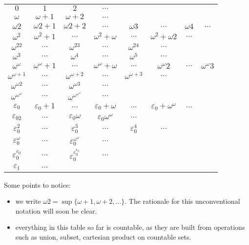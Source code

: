 \documentclass[a4paper]{article}
\begin{document}
{%
  \renewcommand{\arraystretch}{2.5}
\begin{table}[h!]
  \centering
  \begin{tabular}{cccccccc}
    \(0\) & \(1\) & \(2\) & \(\dots\) \\
    \(\omega\) & \(\omega + 1\) & \(\omega + 2\) & \(\dots\) \\
    \(\omega 2\) & \(\omega2 + 1\) & \(\omega2 + 2\) & \(\dots\) & \(\omega3\) & \(\dots\) & \(\omega4\) & \(\dots\) \\
    \(\omega^2\) & \(\omega^2 + 1\) & \(\dots\) & \(\omega^2 + \omega\) & \(\dots\) & \(\omega^2 + \omega2\) & \(\dots\) \\
    \(\omega^22\) & \(\dots\) & \(\omega^23\) & \(\dots\) & \(\omega^24\) & \(\dots\) \\
    \(\omega^3\) & \(\dots\) & \(\omega^4\) & \(\dots\) & \(\omega^5\) & \(\dots\) \\
    \(\omega^\omega\) & \(\omega^\omega + 1\) & \(\dots\) & \(\omega^\omega + \omega\) & \(\dots\) & \(\omega^\omega2\) & \(\dots\) & \(\omega^\omega3\) \\
    \(\omega^{\omega + 1}\) & \(\dots\) & \(\omega^{\omega + 2}\) & \(\dots\) & \(\omega^{\omega + 3}\) & \(\dots\) \\
    \(\omega^{\omega2}\) & \(\dots\) & \(\omega^{\omega 3}\) & \(\dots\) \\
    \(\omega^{\omega^\omega}\) & \(\dots\) & \(\omega^{\omega^{\omega^\omega}}\) & \(\dots\) \\
    \(\varepsilon_0\) & \(\varepsilon_0 + 1\) & \(\dots\) & \(\varepsilon_0 + \omega\) & \(\dots\) & \(\varepsilon_0 + \omega^\omega\) & \(\dots\) \\
    \(\varepsilon_02\) & \(\dots\) & \(\varepsilon_0\omega\) & \(\varepsilon_0\omega^\omega\) & \(\dots\) \\
    \(\varepsilon_0^2\) & \(\dots\) & \(\varepsilon_0^3\) & \(\dots\) & \(\varepsilon_0^4\) & \(\dots\) \\
    \(\varepsilon_0^\omega\) & \(\dots\) & \(\varepsilon_0^{\omega^\omega}\) & \(\dots\) \\
    \(\varepsilon_0^{\varepsilon_0}\) & \(\dots\) & \(\varepsilon_0^{\varepsilon_0^{\varepsilon_0}}\) & \(\dots\) \\
    \(\varepsilon_1\) & \(\dots\)
  \end{tabular}
  \label{tab:ordinals}
\end{table}
}

Some points to notice:
\begin{itemize}
\item we write \(\omega2 = \sup\{\omega + 1, \omega + 2, \dots\}\). The rationale for this unconventional notation will soon be clear.
\item everything in this table so far is countable, as they are built from operations such as union, subset, cartesian product on countable sets.
\end{itemize}
\end{document}
